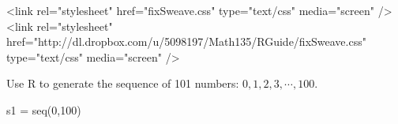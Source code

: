 


\providecommand{\HCode}[1]{#1} %
\HCode{<link rel="stylesheet" href="fixSweave.css" type="text/css"
  media="screen" />}
\HCode{<link rel="stylesheet" href="http://dl.dropbox.com/u/5098197/Math135/RGuide/fixSweave.css" type="text/css"
 media="screen" />}

Use R to generate the sequence of 101 numbers: $0, 1, 2, 3, \cdots, 100$.

\begin{AnswerText}
\begin{Schunk}
\begin{Sinput}
  s1 = seq(0,100)
\end{Sinput}
\end{Schunk}
\end{AnswerText}

